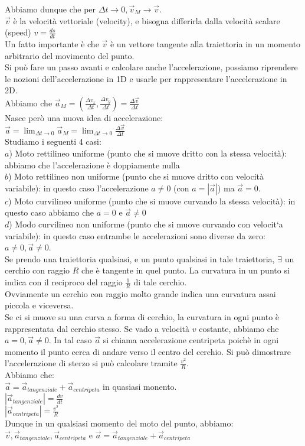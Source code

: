 \documentclass{article}
\begin{document}
Abbiamo dunque che per $\Delta t\to 0, \vec{v}_M\to\vec{v}$.\\
$\vec{v}$ \`{e} la velocit\`{a} vettoriale (velocity), e bisogna differirla dalla 
velocit\`{a} scalare (speed) $v=\frac{ds}{dt}$\\
Un fatto importante \`{e} che $\vec{v}$ \`{e} un vettore tangente alla traiettoria
in un momento arbitrario del movimento del punto.\\
Si pu\`{o} fare un passo avanti e calcolare anche l'accelerazione, possiamo riprendere
le nozioni dell'accelerazione in 1D e usarle per rappresentare l'accelerazione in 2D.\\
Abbiamo che $\vec{a}_M=(\frac{\Delta v_x}{\Delta t}, \frac{\Delta v_y}{\Delta t})=\frac{\Delta \vec{v}}{\Delta t}$\\
Nasce per\`{o} una nuova idea di accelerazione:\\
$\vec{a}=\lim_{\Delta t\to 0}\vec{a}_M=\lim_{\Delta t\to 0}\frac{\Delta \vec{v}}{\Delta t}$\\
Studiamo i seguenti 4 casi:\\
$a$) Moto rettilineo uniforme (punto che si muove dritto con la stessa velocit\`{a}): abbiamo che l'accelerazione \`{e} doppiamente nulla\\
$b$) Moto rettilineo non uniforme (punto che si muove dritto con velocit\`{a} variabile): in questo caso l'accelerazione $a\neq 0$ (con $a=|\vec{a}|$) ma
$\vec{a}=0$.\\
$c$) Moto curvilineo uniforme (punto che si muove curvando la stessa velocit\`{a}): in questo caso abbiamo che $a=0$ e $\vec{a}\neq 0$\\
$d$) Modo curvilineo non uniforme (punto che si muove curvando con velocit`{a} variabile): in questo caso entrambe le accelerazioni sono diverse da zero: $a\neq 0, \vec{a}\neq 0$.\\
Se prendo una traiettoria qualsiasi, e un punto qualsiasi in tale
traiettoria, $\exists$ un cerchio con raggio $R$ che \`{e} tangente in quel punto. 
La curvatura in un punto si indica con il reciproco del raggio $\frac{1}{R}$ di tale cerchio.\\
Ovviamente un cerchio con raggio molto grande indica una curvatura
assai piccola e viceversa.\\
Se ci si muove su una curva a forma di cerchio, la curvatura in ogni punto
\`{e} rappresentata dal cerchio stesso. Se vado a velocit\`{a} $v$ costante, abbiamo che
$a=0,\vec{a}\neq 0$. In tal caso $\vec{a}$ si chiama accelerazione centripeta
poich\`{e} in ogni momento il punto cerca di andare verso il centro
del cerchio. Si pu\`{o} dimostrare l'accelerazione di sterzo si pu\`{o}
calcolare tramite $\frac{v^2}{R}$.\\
Abbiamo che:\\
$\vec{a}=\vec{a}_{tangenziale}+\vec{a}_{centripeta}$ in quasiasi monento.\\
$|\vec{a}_{tangenziale}|=\frac{dv}{dt}$\\
$|\vec{a}_{centripeta}|=\frac{v^2}{R}$\\
Dunque in un qualsiasi momento del moto del punto, abbiamo:\\
$\vec{v}, \vec{a}_{tangenziale}, \vec{a}_{centripeta}$ e $\vec{a} = \vec{a}_{tangenziale}+ \vec{a}_{centripeta}$\\
\end{document}
